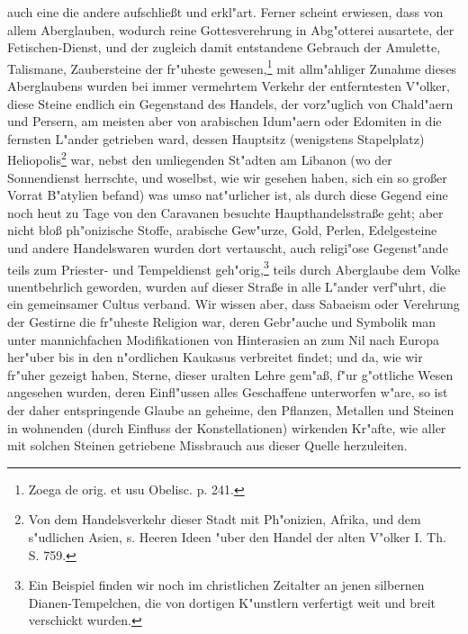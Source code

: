 \documentclass[a4paper, 11pt, oneside, polutonikogreek, german]{article}
\begin{document}
auch eine die andere aufschließt und erkl"art. Ferner scheint erwiesen, dass von allem Aberglauben, wodurch reine Gottesverehrung in Abg"otterei ausartete, der Fetischen-Dienst, und der zugleich damit entstandene Gebrauch der Amulette, Talismane, Zaubersteine der fr"uheste gewesen,\footnote{Zoega de orig. et usu Obelisc. p. 241.} mit allm"ahliger Zunahme dieses Aberglaubens wurden bei immer vermehrtem Verkehr der entferntesten V"olker, diese Steine endlich ein Gegenstand des Handels, der vorz"uglich von Chald"aern und Persern, am meisten aber von arabischen Idum"aern oder Edomiten in die fernsten L"ander getrieben ward, dessen Hauptsitz (wenigstens Stapelplatz) Heliopolis\footnote{Von dem Handelsverkehr dieser Stadt mit Ph"onizien, Afrika, und dem s"udlichen Asien, s. Heeren Ideen "uber den Handel der alten V"olker I. Th. S. 759.} war, nebst den umliegenden St"adten am Libanon (wo der Sonnendienst herrschte, und woselbst, wie wir gesehen haben, sich ein so großer Vorrat B"atylien befand) was umso nat"urlicher ist, als durch diese Gegend eine noch heut zu Tage von den Caravanen besuchte Haupthandelsstraße geht; aber nicht bloß ph"onizische Stoffe, arabische Gew"urze, Gold, Perlen, Edelgesteine und andere Handelswaren wurden dort vertauscht, auch religi"ose Gegenst"ande teils zum Priester- und Tempeldienst geh"orig,\footnote{Ein Beispiel finden wir noch im christlichen Zeitalter an jenen silbernen Dianen-Tempelchen, die von dortigen K"unstlern verfertigt weit und breit verschickt wurden.} teils durch Aberglaube dem Volke unentbehrlich geworden, wurden auf dieser Straße in alle L"ander verf"uhrt, die ein gemeinsamer Cultus verband. Wir wissen aber, dass Sabaeism oder Verehrung der Gestirne die fr"uheste Religion war, deren Gebr"auche und Symbolik man unter mannichfachen Modifikationen von Hinterasien an zum Nil nach Europa her"uber bis in den n"ordlichen Kaukasus verbreitet findet; und da, wie wir fr"uher gezeigt haben, Sterne, dieser uralten Lehre gem"aß, f"ur g"ottliche Wesen angesehen wurden, deren Einfl"ussen alles Geschaffene unterworfen w"are, so ist der daher entspringende Glaube an geheime, den Pflanzen, Metallen und Steinen in wohnenden (durch Einfluss der Konstellationen) wirkenden Kr"afte, wie aller mit solchen Steinen getriebene Missbrauch aus dieser Quelle herzuleiten.
\end{document}
